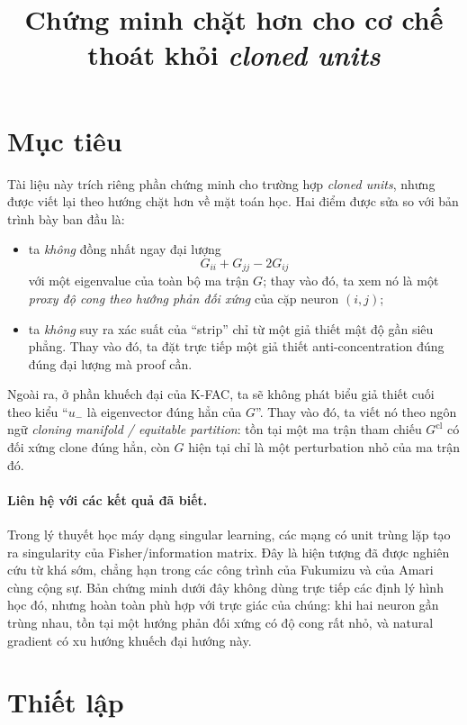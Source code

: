 \documentclass[11pt,a4paper]{article}
\title{Chứng minh chặt hơn cho cơ chế thoát khỏi \emph{cloned units}}
\author{}
\date{}
\begin{document}
\maketitle

\section{Mục tiêu}

Tài liệu này trích riêng phần chứng minh cho trường hợp \emph{cloned units}, nhưng
được viết lại theo hướng chặt hơn về mặt toán học. Hai điểm được sửa so với bản
trình bày ban đầu là:
\begin{itemize}
    \item ta \emph{không} đồng nhất ngay đại lượng
    \[
    G_{ii}+G_{jj}-2G_{ij}
    \]
    với một eigenvalue của toàn bộ ma trận $G$; thay vào đó, ta xem nó là một
    \emph{proxy độ cong theo hướng phản đối xứng} của cặp neuron $(i,j)$;
    \item ta \emph{không} suy ra xác suất của ``strip'' chỉ từ một giả thiết mật
    độ gần siêu phẳng. Thay vào đó, ta đặt trực tiếp một giả thiết
    anti-concentration đúng đúng đại lượng mà proof cần.
\end{itemize}

Ngoài ra, ở phần khuếch đại của K-FAC, ta sẽ không phát biểu giả thiết cuối theo
kiểu ``$u_-$ là eigenvector đúng hẳn của $G$''. Thay vào đó, ta viết nó theo
ngôn ngữ \emph{cloning manifold / equitable partition}: tồn tại một ma trận tham
chiếu $G^{\mathrm{cl}}$ có đối xứng clone đúng hẳn, còn $G$ hiện tại chỉ là một
perturbation nhỏ của ma trận đó.

\paragraph{Liên hệ với các kết quả đã biết.}
Trong lý thuyết học máy dạng singular learning, các mạng có unit trùng lặp tạo ra
singularity của Fisher/information matrix. Đây là hiện tượng đã được nghiên cứu
từ khá sớm, chẳng hạn trong các công trình của Fukumizu và của Amari cùng cộng
sự. Bản chứng minh dưới đây không dùng trực tiếp các định lý hình học đó, nhưng
hoàn toàn phù hợp với trực giác của chúng: khi hai neuron gần trùng nhau, tồn tại
một hướng phản đối xứng có độ cong rất nhỏ, và natural gradient có xu hướng khuếch
đại hướng này.

\section{Thiết lập}
\end{document}
